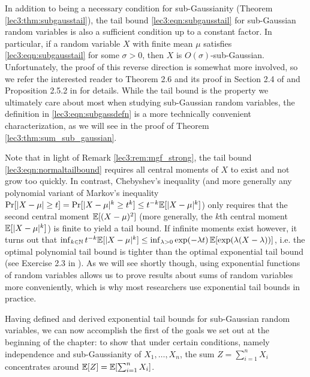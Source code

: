 \begin{remark}\label{lec3:rem:tail_bound_remark}
    In addition to being a necessary condition for sub-Gaussianity (Theorem \ref{lec3:thm:subgausstail}), the tail bound \eqref{lec3:eqn:subgausstail} for sub-Gaussian random variables is also a sufficient condition up to a constant factor. In particular, if a random variable $X$ with finite mean $\mu$ satisfies \eqref{lec3:eqn:subgausstail} for some $\sigma > 0$, then $X$ is $O(\sigma)$-sub-Gaussian. Unfortunately, the proof of this reverse direction is somewhat more involved, so we refer the interested reader to Theorem 2.6 and its proof in Section 2.4 of \cite{wainwright2019high} and Proposition 2.5.2 in \cite{vershynin2018high} for details. While the tail bound is the property we ultimately care about most when studying sub-Gaussian random variables, the definition in \eqref{lec3:eqn:subgassdefn} is a more technically convenient characterization, as we will see in the proof of Theorem \ref{lec3:thm:sum_sub_gaussian}.
\end{remark}

\begin{remark}
    Note that in light of Remark \ref{lec3:rem:mgf_strong}, the tail bound \eqref{lec3:eqn:normaltailbound} requires all central moments of $X$ to exist and not grow too quickly. In contrast, Chebyshev's inequality (and more generally any polynomial variant of Markov's inequality $\Pr[|X-\mu| \geq t] = \Pr[|X-\mu|^k \geq t^k] \leq t^{-k}\mathbb{E}[|X-\mu|^k]$) only requires that the second central moment $\mathbb{E}[(X-\mu)^2]$ (more generally, the $k$th central moment $\mathbb{E}[|X - \mu|^k]$) is finite to yield a tail bound. If infinite moments exist however, it turns out that $\inf_{k \in \mathbb{N}} t^{-k}\mathbb{E}[|X-\mu|^k] \leq \inf_{\lambda > 0} \exp(-\lambda t) \operatorname*{\mathbb{E}}[\exp(\lambda (X-\lambda))]$, i.e. the optimal polynomial tail bound is tighter than the optimal exponential tail bound (see Exercise 2.3 in \cite{wainwright2019high}). As we will see shortly though, using exponential functions of random variables allows us to prove results about sums of random variables more conveniently, which is why most researchers use exponential tail bounds in practice.
\end{remark}

Having defined and derived exponential tail bounds for sub-Gaussian random variables, we can now accomplish the first of the goals we set out at the beginning of the chapter: to show that under certain conditions, namely independence and sub-Gaussianity of $X_1, \dotsc, X_n$, the sum $Z = \sum_{i = 1}^n X_i$ concentrates around $\operatorname*{\mathbb{E}}[Z] = \operatorname*{\mathbb{E}}[\sum_{i = 1}^n X_i]$.

